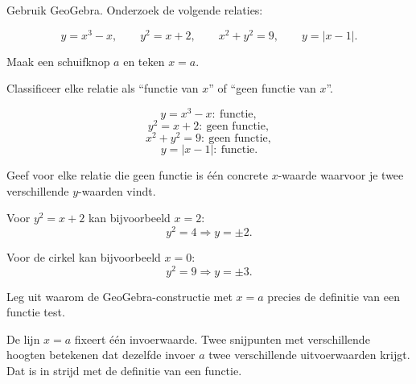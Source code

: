 \documentclass{ximera}
\begin{document}
\begin{oefening}{\oefU\ESS}

Gebruik GeoGebra. Onderzoek de volgende relaties:

\[
y=x^3-x,\qquad
y^2=x+2,\qquad
x^2+y^2=9,\qquad
y=|x-1|.
\]

Maak een schuifknop \(a\) en teken \(x=a\).

\begin{question}
Classificeer elke relatie als ``functie van \(x\)'' of ``geen functie van \(x\)''.

\begin{oplossing}
\[
y=x^3-x:\ \text{functie},
\]
\[
y^2=x+2:\ \text{geen functie},
\]
\[
x^2+y^2=9:\ \text{geen functie},
\]
\[
y=|x-1|:\ \text{functie}.
\]
\end{oplossing}
\end{question}

\begin{question}
Geef voor elke relatie die geen functie is één concrete \(x\)-waarde
waarvoor je twee verschillende \(y\)-waarden vindt.

\begin{oplossing}
Voor \(y^2=x+2\) kan bijvoorbeeld \(x=2\):
\[
y^2=4\Rightarrow y=\pm2.
\]

Voor de cirkel kan bijvoorbeeld \(x=0\):
\[
y^2=9\Rightarrow y=\pm3.
\]
\end{oplossing}
\end{question}

\begin{question}
Leg uit waarom de GeoGebra-constructie met \(x=a\) precies de definitie
van een functie test.

\begin{oplossing}
De lijn \(x=a\) fixeert één invoerwaarde. Twee snijpunten met verschillende
hoogten betekenen dat dezelfde invoer \(a\) twee verschillende uitvoerwaarden krijgt.
Dat is in strijd met de definitie van een functie.
\end{oplossing}
\end{question}

\end{oefening}

\end{document}
